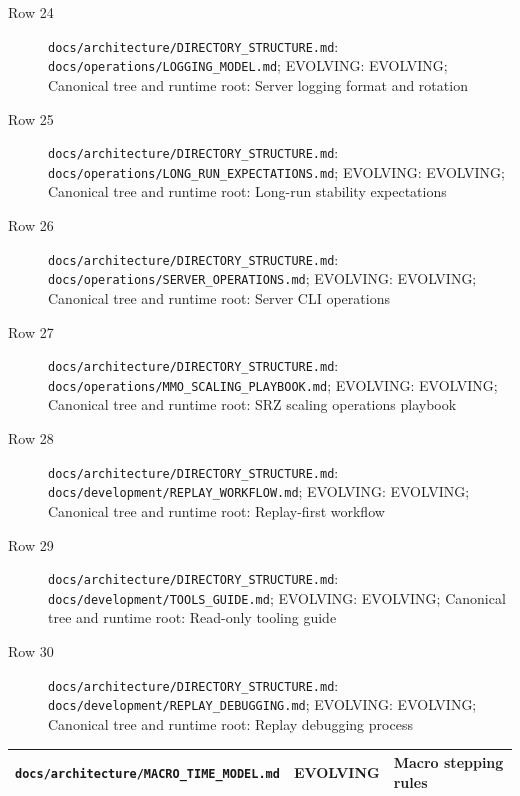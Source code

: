 \documentclass[9pt,a4paper,openany]{book}
\newcommand{\toprule}{\hline}
\newcommand{\midrule}{\hline}
\newcommand{\bottomrule}{\hline}
\begin{document}
\begin{description}
\item[Row 24] \texttt{docs/\allowbreak{}architecture/\allowbreak{}DIRECTORY\_\allowbreak{}STRUCTURE.\allowbreak{}md}: \texttt{docs/\allowbreak{}operations/\allowbreak{}LOGGING\_\allowbreak{}MODEL.\allowbreak{}md}; EVOLVING: EVOLVING; Canonical tree and runtime root: Server logging format and rotation
\item[Row 25] \texttt{docs/\allowbreak{}architecture/\allowbreak{}DIRECTORY\_\allowbreak{}STRUCTURE.\allowbreak{}md}: \texttt{docs/\allowbreak{}operations/\allowbreak{}LONG\_\allowbreak{}RUN\_\allowbreak{}EXPECTATIONS.\allowbreak{}md}; EVOLVING: EVOLVING; Canonical tree and runtime root: Long-\allowbreak{}run stability expectations
\item[Row 26] \texttt{docs/\allowbreak{}architecture/\allowbreak{}DIRECTORY\_\allowbreak{}STRUCTURE.\allowbreak{}md}: \texttt{docs/\allowbreak{}operations/\allowbreak{}SERVER\_\allowbreak{}OPERATIONS.\allowbreak{}md}; EVOLVING: EVOLVING; Canonical tree and runtime root: Server CLI operations
\item[Row 27] \texttt{docs/\allowbreak{}architecture/\allowbreak{}DIRECTORY\_\allowbreak{}STRUCTURE.\allowbreak{}md}: \texttt{docs/\allowbreak{}operations/\allowbreak{}MMO\_\allowbreak{}SCALING\_\allowbreak{}PLAYBOOK.\allowbreak{}md}; EVOLVING: EVOLVING; Canonical tree and runtime root: SRZ scaling operations playbook
\item[Row 28] \texttt{docs/\allowbreak{}architecture/\allowbreak{}DIRECTORY\_\allowbreak{}STRUCTURE.\allowbreak{}md}: \texttt{docs/\allowbreak{}development/\allowbreak{}REPLAY\_\allowbreak{}WORKFLOW.\allowbreak{}md}; EVOLVING: EVOLVING; Canonical tree and runtime root: Replay-\allowbreak{}first workflow
\item[Row 29] \texttt{docs/\allowbreak{}architecture/\allowbreak{}DIRECTORY\_\allowbreak{}STRUCTURE.\allowbreak{}md}: \texttt{docs/\allowbreak{}development/\allowbreak{}TOOLS\_\allowbreak{}GUIDE.\allowbreak{}md}; EVOLVING: EVOLVING; Canonical tree and runtime root: Read-\allowbreak{}only tooling guide
\item[Row 30] \texttt{docs/\allowbreak{}architecture/\allowbreak{}DIRECTORY\_\allowbreak{}STRUCTURE.\allowbreak{}md}: \texttt{docs/\allowbreak{}development/\allowbreak{}REPLAY\_\allowbreak{}DEBUGGING.\allowbreak{}md}; EVOLVING: EVOLVING; Canonical tree and runtime root: Replay debugging process
\end{description}


\begin{center}
{\small\renewcommand{\arraystretch}{1.18}
\begin{tabularx}{\linewidth}{@{}>{\raggedright\arraybackslash}X >{\raggedright\arraybackslash}X >{\raggedright\arraybackslash}X@{}}
\toprule
\textbf{\texttt{docs/\allowbreak{}architecture/\allowbreak{}MACRO\_\allowbreak{}TIME\_\allowbreak{}MODEL.\allowbreak{}md}} & \textbf{EVOLVING} & \textbf{Macro stepping rules} \\
\midrule
\bottomrule
\end{tabularx}
}
\end{center}
\end{document}

